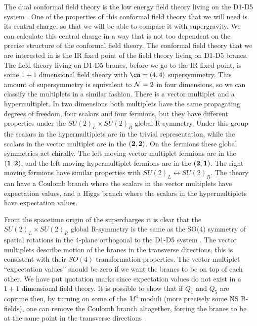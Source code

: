 The dual conformal field theory is the low energy field theory 
living on the D1-D5 system \cite{Maldacena:1996ky}.
One of the properties of this conformal field theory that we will need
is its central charge, so that we will be able to compare it with 
supergravity. We can calculate this central charge in a way that
is not too
dependent on the precise structure of the conformal field theory. 
The conformal field theory that we are interested in is the IR fixed
point of the field theory living on D1-D5 branes. The field theory
living on D1-D5 branes, before we go to the IR fixed point, is 
some $1+1$ dimensional field theory with $\cn=(4,4)$ supersymmetry. 
This amount of supersymmetry is equivalent to ${\cal N } = 2 $ in
four dimensions, so we can classify the multiplets in a similar fashion.
There is a vector multiplet and a hypermultiplet. In two dimensions
both multiplets have the same propagating degrees of freedom, four
scalars and four fermions, but they have different properties
under the $SU(2)_L \times SU(2)_R$ global R-symmetry. 
Under this group the scalars in the hypermultiplets are in the trivial
representation, while the scalars in the vector multiplet are in the
 ${\bf(2,2)}$. On the fermions these global symmetries act chirally. 
The left moving vector multiplet fermions 
are in the ${\bf (1,2)}$, and
the left moving hypermultiplet fermions are in the ${\bf (2,1)}$.  
The right moving fermions have similar properties with 
$SU(2)_L \leftrightarrow SU(2)_R$. 
The theory can have a Coulomb branch where the scalars in the 
vector multiplets have 
expectation values, and a Higgs branch where the scalars in the
hypermultiplets have expectation
values. 

From the spacetime origin of the supercharges it is clear that the
 $SU(2)_L \times SU(2)_R$ global R-symmetry is the same as the
SO(4) symmetry of spatial rotations in the 4-plane orthogonal to the
D1-D5 system \cite{Breckenridge:1996is,Vafa:1994tf,Vafa:1996bm}.
 The vector multiplets describe motion of the branes
in the transverse directions, this is consistent with their $SO(4)$ 
transformation properties. The vector multiplet ``expectation values''
should be zero if we want the branes to be on top of each other.
We have put quotation marks since expectation values do not  exist in a $1+1$
dimensional field theory. It is possible to show that if $Q_1$ and
$Q_5$ are coprime then,  
by turning on some of the $M^4$ moduli (more precisely some NS B-fields),
one can remove the Coulomb branch altogether, forcing the branes
to be at the same point in the transverse directions 
\cite{Dijkgraaf:1998gf,Seiberg:1999xz}. 

